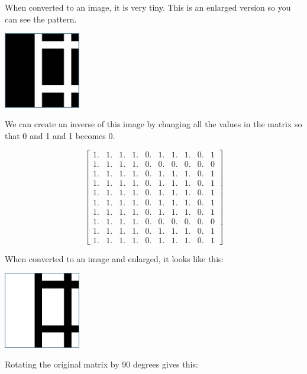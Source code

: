 When converted to an image, it is very tiny. This is an enlarged version so you can see the pattern.

\includegraphics[width=0.25\textwidth]{normal.png}

We can create an inverse of this image by changing all the values in the matrix so that 0 and 1 and 1 becomes 0. 

$$\begin{bmatrix}
1. & 1. & 1. & 1. & 0. & 1. & 1. & 1. & 0. & 1\\
1. & 1. & 1. & 1. & 0. & 0. & 0. & 0. & 0. & 0\\
1. & 1. & 1. & 1. & 0. & 1. & 1. & 1. & 0. & 1\\
1. & 1. & 1. & 1. & 0. & 1. & 1. & 1. & 0. & 1\\
1. & 1. & 1. & 1. & 0. & 1. & 1. & 1. & 0. & 1\\
1. & 1. & 1. & 1. & 0. & 1. & 1. & 1. & 0. & 1\\
1. & 1. & 1. & 1. & 0. & 1. & 1. & 1. & 0. & 1\\
1. & 1. & 1. & 1. & 0. & 0. & 0. & 0. & 0. & 0\\
1. & 1. & 1. & 1. & 0. & 1. & 1. & 1. & 0. & 1\\
1. & 1. & 1. & 1. & 0. & 1. & 1. & 1. & 0. & 1
\end{bmatrix}$$

When converted to an image and enlarged, it looks like this:

\includegraphics[width=0.25\textwidth]{inverse.png}

Rotating the original matrix by 90 degrees gives this:


